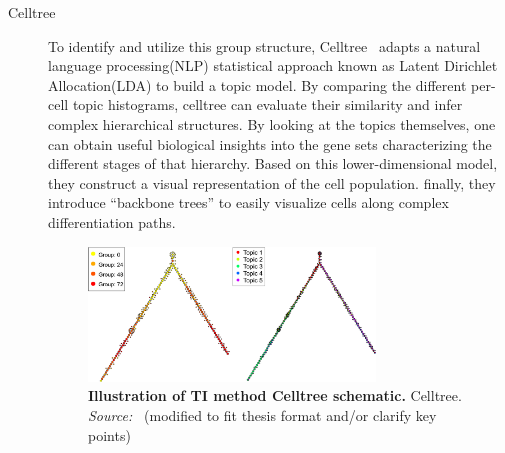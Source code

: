 \begin{description}
    \item[Celltree]
    To identify and utilize this group structure, Celltree~\citep{duverle2016celltree} adapts a natural language processing(NLP) statistical approach known as Latent Dirichlet Allocation(LDA) to build a topic model. By comparing the different per-cell topic histograms, celltree can evaluate their similarity and infer complex hierarchical structures. By looking at the topics themselves, one can obtain useful biological insights into the gene sets characterizing the different stages of that hierarchy. Based on this lower-dimensional model, they construct a visual representation of the cell population. finally, they introduce “backbone trees” to easily visualize cells along complex differentiation paths.
    \begin{figure}[ht!]
    	\centering
    	\includegraphics[width=0.75\textwidth]{TI_Alg_celltree/fig}
    	\vspace{0.1cm}
    	\caption[Illustration of TI method Celltree schematic.]{\textbf{Illustration of TI method Celltree schematic.} Celltree. \emph{Source:~\cite{duverle2016celltree}} (modified to fit thesis format and/or clarify key points)
    	}
    	\label{fig:TI_Alg_celltree}
    \end{figure}


\end{description}
